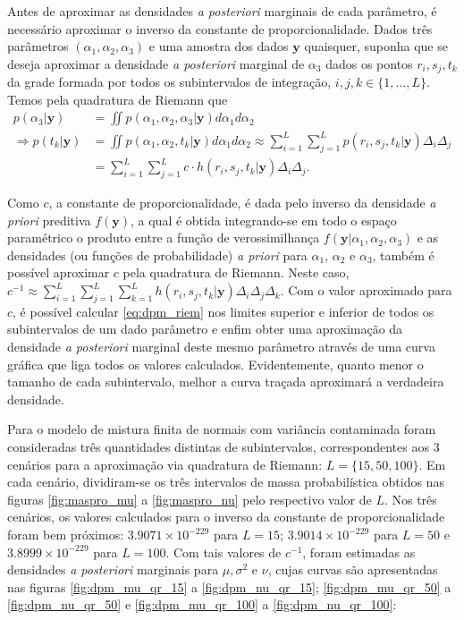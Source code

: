 Antes de aproximar as densidades \textit{a posteriori} marginais de cada parâmetro, é necessário aproximar o inverso da constante de proporcionalidade. Dados três parâmetros $(\alpha_1, \alpha_2, \alpha_3)$ e uma amostra dos dados $\bm{y}$ quaisquer, suponha que se deseja aproximar a densidade \textit{a posteriori} marginal de $\alpha_3$ dados os pontos $r_i, s_j, t_k$ da grade formada por todos os subintervalos de integração, $i, j, k \in \{1, \ldots, L\}$. Temos pela quadratura de Riemann que
\begin{align}
p(\alpha_3 | \bm{y})
&= \iint p(\alpha_1, \alpha_2, \alpha_3 | \bm{y}) d\alpha_1 d\alpha_2 \nonumber \\
\Rightarrow p(t_k | \bm{y})
&= \iint p(\alpha_1, \alpha_2, t_k | \bm{y}) d\alpha_1 d\alpha_2 \approx \sum_{i=1}^{L} \sum_{j=1}^{L} p(r_i, s_j, t_k | \bm{y}) \Delta_i \Delta_j \nonumber \\
&= \sum_{i=1}^{L} \sum_{j=1}^{L} c \cdot h(r_i, s_j, t_k | \bm{y}) \Delta_i \Delta_j. \label{eq:dpm_riem}
\end{align}

Como $c$, a constante de proporcionalidade, é dada pelo inverso da densidade \textit{a priori} preditiva $f(\bm{y})$, a qual é obtida integrando-se em todo o espaço paramétrico o produto entre a função de verossimilhança $f(\bm{y} | \alpha_1, \alpha_2, \alpha_3)$ e as densidades (ou funções de probabilidade) \textit{a priori} para $\alpha_1$, $\alpha_2$ e $\alpha_3$, também é possível aproximar $c$ pela quadratura de Riemann. Neste caso, $c^{-1} \approx \sum_{i=1}^{L} \sum_{j=1}^{L} \sum_{k=1}^{L} h(r_i, s_j, t_k | \bm{y}) \Delta_i \Delta_j \Delta_k$. Com o valor aproximado para $c$, é possível calcular \eqref{eq:dpm_riem} nos limites superior e inferior de todos os subintervalos de um dado parâmetro e enfim obter uma aproximação da densidade \emph{a posteriori} marginal deste mesmo parâmetro através de uma curva gráfica que liga todos os valores calculados. Evidentemente, quanto menor o tamanho de cada subintervalo, melhor a curva traçada aproximará a verdadeira densidade.

Para o modelo de mistura finita de normais com variância contaminada foram consideradas três quantidades distintas de subintervalos, correspondentes aos 3 cenários para a aproximação via quadratura de Riemann: $L = \{15, 50, 100\}$. Em cada cenário, dividiram-se os três intervalos de massa probabilística obtidos nas figuras \ref{fig:maspro_mu} a \ref{fig:maspro_nu} pelo respectivo valor de $L$. Nos três cenários, os valores calculados para o inverso da constante de proporcionalidade foram bem próximos: $3.9071 \times 10^{-229}$ para $L = 15$; $3.9014 \times 10^{-229}$ para $L = 50$ e $3.8999 \times 10^{-229}$ para $L = 100$. Com tais valores de $c^{-1}$, foram estimadas as densidades \textit{a posteriori} marginais para $\mu, \sigma^2$ e $\nu$, cujas curvas são apresentadas nas figuras \ref{fig:dpm_mu_qr_15} a \ref{fig:dpm_nu_qr_15}; \ref{fig:dpm_mu_qr_50} a \ref{fig:dpm_nu_qr_50} e \ref{fig:dpm_mu_qr_100} a \ref{fig:dpm_nu_qr_100}:

